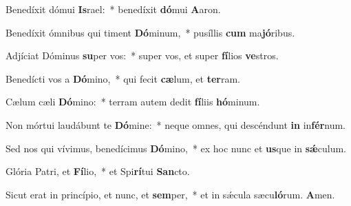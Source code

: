 \item Benedíxit dómui \textbf{Is}rael:~* benedíxit \textbf{dó}mui \textbf{A}aron.
\item Benedíxit ómnibus qui timent \textbf{Dó}minum,~* pusíllis \textbf{cum} ma\textbf{jó}ribus.
\item Adjíciat Dóminus \textbf{su}per vos:~* super vos, et super \textbf{fí}lios \textbf{ve}stros.
\item Benedícti vos a \textbf{Dó}mino,~* qui fecit \textbf{cæ}lum, et \textbf{ter}ram.
\item Cælum cæli \textbf{Dó}mino:~* terram autem dedit \textbf{fí}liis \textbf{hó}minum.
\item Non mórtui laudábunt te \textbf{Dó}mine:~* neque o\-mnes, qui descéndunt \textbf{in} in\textbf{fér}num.
\item Sed nos qui vívimus, benedícimus \textbf{Dó}mino,~* ex hoc nunc et \textbf{us}que in \textbf{sǽ}culum.
\item Glória Patri, et \textbf{Fí}lio,~* et Spi\textbf{rí}tui \textbf{San}cto.
\item Sicut erat in princípio, et nunc, et \textbf{sem}per,~* et in sǽcula sæcu\textbf{ló}rum. \textbf{A}men.
